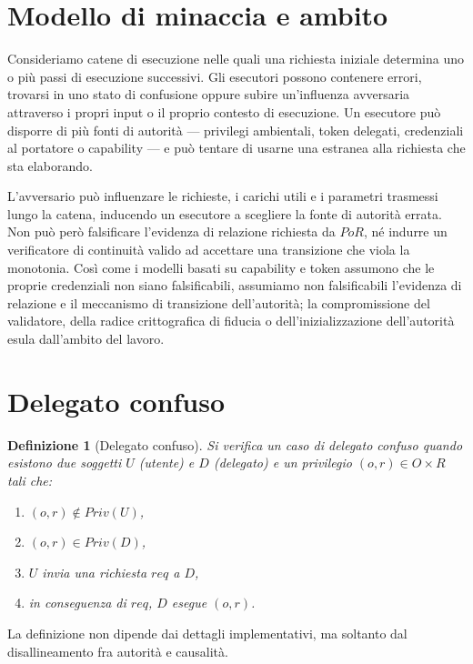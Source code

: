 \documentclass[11pt]{article}
\newtheorem{definition}{Definizione}
\begin{document}
\section{Modello di minaccia e ambito}

Consideriamo catene di esecuzione nelle quali una richiesta iniziale determina
uno o più passi di esecuzione successivi. Gli esecutori possono contenere
errori, trovarsi in uno stato di confusione oppure subire un'influenza avversaria
attraverso i propri input o il proprio contesto di esecuzione. Un esecutore può
disporre di più fonti di autorità --- privilegi ambientali, token delegati,
credenziali al portatore o capability --- e può tentare di usarne una estranea
alla richiesta che sta elaborando.

L'avversario può influenzare le richieste, i carichi utili e i parametri
trasmessi lungo la catena, inducendo un esecutore a scegliere la fonte di
autorità errata. Non può però falsificare l'evidenza di relazione richiesta da
$PoR$, né indurre un verificatore di continuità valido ad accettare una
transizione che viola la monotonia. Così come i modelli basati su capability e
token assumono che le proprie credenziali non siano falsificabili, assumiamo non
falsificabili l'evidenza di relazione e il meccanismo di transizione
dell'autorità; la compromissione del validatore, della radice crittografica di
fiducia o dell'inizializzazione dell'autorità esula dall'ambito del lavoro.

\section{Delegato confuso}

\begin{definition}[Delegato confuso]\label{def:confused}
Si verifica un caso di delegato confuso quando esistono due soggetti $U$
(utente) e $D$ (delegato) e un privilegio $(o,r) \in O \times R$ tali che:
\begin{enumerate}
    \item $(o,r) \notin Priv(U)$,
    \item $(o,r) \in Priv(D)$,
    \item $U$ invia una richiesta $req$ a $D$,
    \item in conseguenza di $req$, $D$ esegue $(o,r)$.
\end{enumerate}
\end{definition}

La definizione non dipende dai dettagli implementativi, ma soltanto dal
disallineamento fra autorità e causalità.
\end{document}
